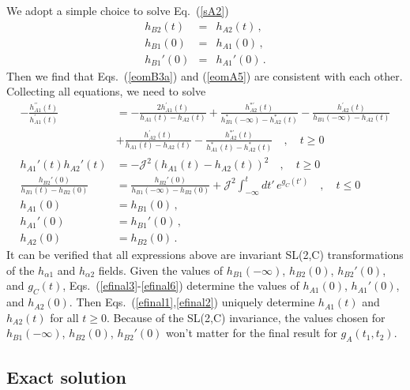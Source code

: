 \documentclass[prx,aps,onecolumn,amsfonts,showpacs,superscriptaddress,preprint,eqsecnum]
{revtex4-1}
\def\bea{\begin{eqnarray}}
\def\eea{\end{eqnarray}}
\newcommand{\nn}{\nonumber \\}
\begin{document}
We adopt a simple choice to solve Eq.~(\ref{sA2})
\bea
h_{B2} (t) &=& h_{A2} (t)\,, \nn
h_{B1} (0) &=& h_{A1} (0)\,, \nn
h_{B1}' (0) &=& h_{A1}' (0)\,. \label{exact3}
\eea
Then we find that Eqs.~(\ref{eomB3a}) and (\ref{eomA5}) are consistent with each other.
Collecting all equations, we need to solve
\begin{align}
-\frac{h_{A1}^{\prime\prime} (t)}{h_{A1}^{\prime} (t)} &= 
- \frac{2 h_{A1}^{\prime} (t)}{h_{A1} (t) - h_{A2} (t)} 
+ \frac{h_{A2}^{\ast\prime} (t)}{h_{B1}^{\ast} (-\infty) - h_{A2}^{\ast} (t)}
-  \frac{h_{A2}^{\prime} (t)}{h_{B1} (-\infty) - h_{A2} (t)} \nn &
+ \frac{h_{A2}^{\prime} (t)}{h_{A1} (t) - h_{A2} (t)} 
- \frac{h_{A2}^{\ast\prime} (t)}{h_{A1}^{\ast} (t) - h_{A2}^\ast (t)} \quad , \quad t \geq 0 \label{efinal1} \\
h_{A 1}' (t) h_{A 2}' (t) &= - \mathcal{J}^2  (h_{A 1} (t) - h_{A 2} (t))^2 \quad , \quad t \geq 0 \label{efinal2} \\
\frac{h_{B2}' (0)}{h_{B1} (t) - h_{B2} (0)} &= \frac{h_{B2}' (0)}{h_{B1} (-\infty) - h_{B2} (0)} + 
\mathcal{J}^2 \int_{-\infty}^{t} dt' \, e^{g_C (t')} \quad , \quad t \leq 0 \label{efinal3} \\
h_{A1} (0) & = h_{B1} (0) \,,\label{efinal4} \\
h_{A1}' (0) & = h_{B1}' (0) \,,\label{efinal5} \\
h_{A2} (0) & = h_{B2} (0) \,.\label{efinal6}
\end{align}
It can be verified that all expressions above are invariant SL(2,C) transformations of the $h_{\alpha 1}$
and $h_{\alpha 2}$ fields.
Given the values of $h_{B1}(-\infty)$, $h_{B2} (0)$, $h_{B2}' (0)$, and $g_C (t)$, 
Eqs.~(\ref{efinal3}-\ref{efinal6}) determine the values of $h_{A1} (0)$,  $h_{A1}' (0)$, and $h_{A2} (0)$.
Then
Eqs.~(\ref{efinal1},\ref{efinal2}) uniquely determine $h_{A1} (t)$ and $h_{A2} (t)$ for all $t \geq 0$. 
Because of the SL(2,C) invariance, the values chosen for $h_{B1}(-\infty)$, $h_{B2} (0)$, $h_{B2}' (0)$ won't matter for the 
final result for $g_A (t_1, t_2)$. 

\subsection{Exact solution}
\label{sec:exact}
\end{document}
